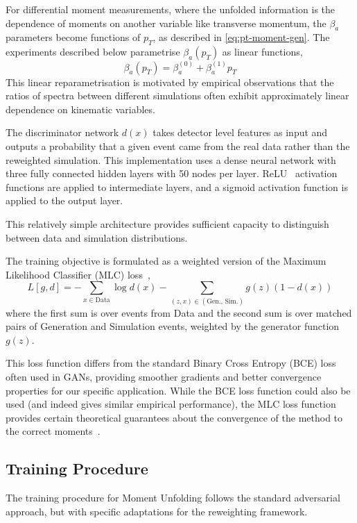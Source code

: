     For differential moment measurements, where the unfolded information is the dependence of moments on another variable like transverse momentum, the $\beta_a$ parameters become functions of $p_T$, as described in \cref{eq:pt-moment-gen}.
    The experiments described below parametrise $\beta_a(p_T)$ as linear functions, 
    \[
        \beta_a(p_T) = \beta_a^{(0)} + \beta_a^{(1)}p_T
    \]
    This linear reparametrisation is motivated by empirical observations that the ratios of spectra between different simulations often exhibit approximately linear dependence on kinematic variables.

    The discriminator network $d(x)$ takes detector level features as input and outputs a probability that a given event came from the real data rather than the reweighted simulation.
    This implementation uses a dense neural network with three fully connected hidden layers with 50 nodes per layer.
    ReLU~\cite{Householder1941ALemmas} activation functions are applied to intermediate layers, and a sigmoid activation function is applied to the output layer.

    This relatively simple architecture provides sufficient capacity to distinguish between data and simulation distributions.

    The training objective is formulated as a weighted version of the Maximum Likelihood Classifier (MLC) loss~\cite{Stoye2018Likelihood-freeEstimator},
    \[
        \label{eq:numericloss}
        L[g,d] = -\sum_{x \in \text{Data}} \log d(x) - \sum_{(z,x) \in (\text{Gen., Sim.})} g(z)(1-d(x))
    \]
    where the first sum is over events from Data and the second sum is over matched pairs of Generation and Simulation events, weighted by the generator function $g(z)$.

    This loss function differs from the standard Binary Cross Entropy (BCE) loss often used in GANs, providing smoother gradients and better convergence properties for our specific application.
    While the BCE loss function could also be used (and indeed gives similar empirical performance), the MLC loss function provides certain theoretical guarantees about the convergence of the method to the correct moments~\cite{desai2024moment}.
    \subsection{Training Procedure}
        The training procedure for Moment Unfolding follows the standard adversarial approach, but with specific adaptations for the reweighting framework.
        
